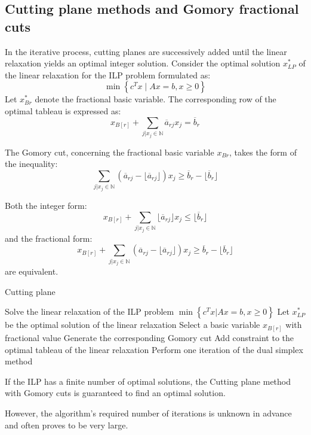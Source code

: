 \subsection{Cutting plane methods and Gomory fractional cuts}
In the iterative process, cutting planes are successively added until the linear relaxation yields an optimal integer solution.
Consider the optimal solution $x^{\ast}_{LP}$ of the linear relaxation for the ILP problem formulated as:
\[ \min \left\{ c^T x \mid Ax = b, x \geq 0 \right\} \]
Let $x^{\ast}_{B{r}}$ denote the fractional basic variable. 
The corresponding row of the optimal tableau is expressed as:
\[ x_{B[r]} + \displaystyle \sum_{j \vert x_j \in \mathbb{N}} \overline{a}_{rj} x_j = \overline{b}_r \]
\begin{definition}
    The Gomory cut, concerning the fractional basic variable $x_{B{r}}$, takes the form of the inequality:
    \[ \displaystyle \sum_{j \vert x_j \in \mathbb{N}} \left( \overline{a}_{rj} - \lfloor \overline{a}_{rj} \rfloor \right) x_j \geq \overline{b}_r - \lfloor \overline{b}_r \rfloor \]
\end{definition}
\begin{property}
    Both the integer form:
    \[ \displaystyle x_{B[r]} + \sum_{j \vert x_j \in \mathbb{N}} \lfloor\overline{a}_{rj}\rfloor x_j \leq \lfloor\overline{b}_r\rfloor \]
    and the fractional form:
    \[ \displaystyle x_{B[r]} + \sum_{j \vert x_j \in \mathbb{N}} \left( \overline{a}_{rj} - \lfloor \overline{a}_{rj} \rfloor \right) x_j \geq \overline{b}_r - \lfloor \overline{b}_r \rfloor \]
    are equivalent.
\end{property}

\begin{algorithm}[H]
    \caption{Cutting plane}
        \begin{algorithmic}[1]
            \State Solve the linear relaxation of the ILP problem $\min\left\{c^T x \vert Ax = b, x \geq 0 \right\}$
            \State Let $x^{\ast}_{LP}$ be the optimal solution of the linear relaxation
                \State Select a basic variable $x_{B[r]}$ with fractional value
                \State Generate the corresponding Gomory cut
                \State Add constraint to the optimal tableau of the linear relaxation
                \State Perform one iteration of the dual simplex method
            \EndWhile
        \end{algorithmic}
\end{algorithm}
\begin{theorem}
    If the ILP has a finite number of optimal solutions, the Cutting plane method with Gomory cuts is guaranteed to find an optimal solution.
\end{theorem}
However, the algorithm's required number of iterations is unknown in advance and often proves to be very large.


